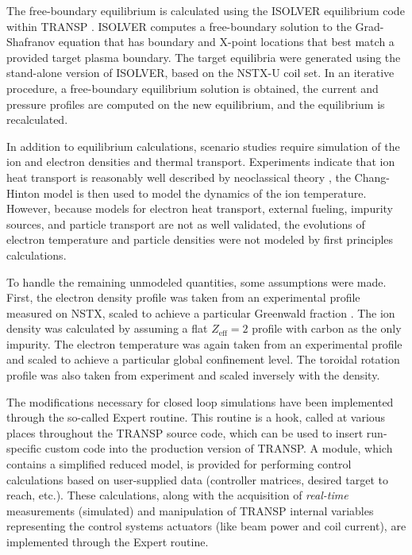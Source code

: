\documentclass[12pt,lot, lof]{puthesis}
\begin{document}
The free-boundary equilibrium is calculated using the ISOLVER equilibrium code within TRANSP \cite{Huang06}. ISOLVER computes a free-boundary solution to the Grad-Shafranov equation that has boundary and X-point locations that best match a provided target plasma boundary. The target equilibria were generated using the stand-alone version of ISOLVER, based on the NSTX-U coil set. In an iterative procedure, a free-boundary equilibrium solution is obtained, the current and pressure profiles are computed on the new equilibrium, and the equilibrium is recalculated.

In addition to equilibrium calculations, scenario studies require simulation of the ion and electron densities and thermal transport. Experiments indicate that ion heat transport is reasonably well described by neoclassical theory \cite{Kaye07, Kaye007,Valovic11}, the Chang-Hinton model \cite{Chang82} is then used to model the dynamics of the ion temperature. However, because models for electron heat transport, external fueling, impurity sources, and particle transport are not as well validated, the evolutions of electron temperature and particle densities were not modeled by first principles calculations.

To handle the remaining unmodeled quantities, some assumptions were made. First, the electron density profile was taken from an experimental profile measured on NSTX, scaled to achieve a particular Greenwald fraction \cite{Greenwald88}. The ion density was calculated by assuming a flat $Z_\text{eff} = 2$ profile with carbon as the only impurity. The electron temperature was again taken from an experimental profile and scaled to achieve a particular global confinement level. The toroidal rotation profile was also taken from experiment and scaled inversely with the density.

The modifications necessary for closed loop simulations have been implemented through the so-called Expert routine. This routine is a hook, called at various places throughout the TRANSP source code, which can be used to insert run-specific custom code into the production version of TRANSP.
A module, which contains a simplified reduced model, is provided for performing control calculations based on user-supplied data (controller matrices, desired target to reach, etc.). These calculations, along with the acquisition of \emph{real-time} measurements (simulated) and manipulation of TRANSP internal variables representing the control systems actuators (like beam power and coil current), are implemented through the Expert routine.
\end{document}
